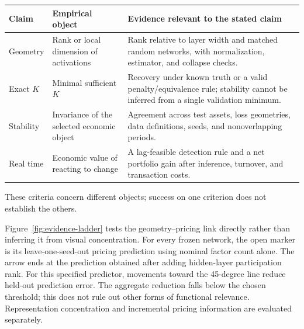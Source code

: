 \begin{widetable}[!tbp]
\centering
\caption{Four claims about low-dimensional pricing representations}
\label{tab:propositions}
\footnotesize
\begin{threeparttable}
\begin{tabularx}{\textwidth}{@{}p{}p{}X@{}}
\toprule
Claim & Empirical object & Evidence relevant to the stated claim \\
\midrule
Geometry & Rank or local dimension of activations & Rank relative to layer width and matched random networks, with normalization, estimator, and collapse checks. \\
Exact $K$ & Minimal sufficient $K$ & Recovery under known truth or a valid penalty/equivalence rule; stability cannot be inferred from a single validation minimum. \\
Stability & Invariance of the selected economic object & Agreement across test assets, loss geometries, data definitions, seeds, and nonoverlapping periods. \\
Real time & Economic value of reacting to change & A lag-feasible detection rule and a net portfolio gain after inference, turnover, and transaction costs. \\
\bottomrule
\end{tabularx}
\begin{tablenotes}[flushleft]\footnotesize
\item These criteria concern different objects; success on one criterion does not establish the others.
\end{tablenotes}
\end{threeparttable}
\end{widetable}

Figure~\ref{fig:evidence-ladder} tests the geometry--pricing link directly rather than inferring it from visual concentration. For every frozen network, the open marker is its leave-one-seed-out pricing prediction using nominal factor count alone. The arrow ends at the prediction obtained after adding hidden-layer participation rank. For this specified predictor, movements toward the 45-degree line reduce held-out prediction error. The aggregate reduction falls below the chosen threshold; this does not rule out other forms of functional relevance. Representation concentration and incremental pricing information are evaluated separately.

